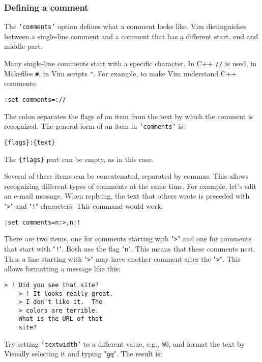 \subsubsection{Defining a comment}
The \texttt{'comments'} option defines what a comment looks like.
Vim distinguishes between a single-line comment and a comment that has a different start, end and middle part.

Many single-line comments start with a specific character.
In C++ \texttt{//} is used, in Makefiles \texttt{\#}, in Vim scripts \texttt{"}.
For example, to make Vim understand C++ comments:

\begin{Verbatim}[samepage=true]
 :set comments=://
\end{Verbatim}

The colon separates the flags of an item from the text by which the comment is recognized.
The general form of an item in \texttt{'comments'} is:

\begin{Verbatim}[samepage=true]
    {flags}:{text}
\end{Verbatim}

The \texttt{\{flags\}} part can be empty, as in this case.

Several of these items can be concatenated, separated by commas.
This allows recognizing different types of comments at the same time.
For example, let's edit an e-mail message.
When replying, the text that others wrote is preceded with "\texttt{>}" and "\texttt{!}" characters.
This command would work:

\begin{Verbatim}[samepage=true]
 :set comments=n:>,n:!
\end{Verbatim}

There are two items, one for comments starting with "\texttt{>}" and one for comments that start with "\texttt{!}".
Both use the flag "\texttt{n}".
This means that these comments nest.
Thus a line starting with "\texttt{>}" may have another comment after the "\texttt{>}".
This allows formatting a message like this:

\begin{Verbatim}[samepage=true]
    > ! Did you see that site? 
    > ! It looks really great. 
    > I don't like it.  The 
    > colors are terrible. 
    What is the URL of that 
    site? 
\end{Verbatim}

Try setting \texttt{'textwidth'} to a different value, e.g., 80, and format the text by Visually selecting it and typing "\texttt{gq}".
The result is:


